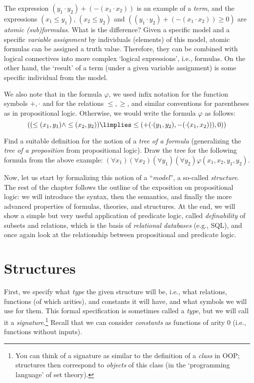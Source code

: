 The expression $(y_1 \cdot y_2)+(-(x_1\cdot x_2))$ is an example of a \emph{term}, and the expressions $(x_1\leq y_1)$, $(x_2\leq y_2)$ and $((y_1 \cdot y_2)+(-(x_1\cdot x_2))\geq 0)$ are \emph{atomic (sub)formulas}. What is the difference? Given a specific model and a specific \emph{variable assignment} by individuals (elements) of this model, atomic formulas can be assigned a truth value. Therefore, they can be combined with logical connectives into more complex `logical expressions', i.e., formulas. On the other hand, the `result' of a term (under a given variable assignment) is some specific individual from the model.

We also note that in the formula $\varphi$, we used infix notation for the function symbols $+,\cdot$ and for the relations $\leq,\geq$, and similar conventions for parentheses as in propositional logic. Otherwise, we would write the formula $\varphi$ as follows:
$$
((\leq (x_1,y_1) \land \leq(x_2,y_2))\limplies \leq(+(\cdot (y_1,y_2),-(\cdot(x_1,x_2))),0))
$$

\begin{exercise}
Find a suitable definition for the notion of a \emph{tree of a formula} (generalizing the \emph{tree of a proposition} from propositional logic). Draw the tree for the following formula from the above example: $(\forall x_1)(\forall x_2)(\forall y_1)(\forall y_2)\varphi(x_1,x_2,y_1,y_2)$.
\end{exercise}

Now, let us start by formalizing this notion of a ``\emph{model}'', a so-called \emph{structure}. The rest of the chapter follows the outline of the exposition on propositional logic: we will introduce the syntax, then the semantics, and finally the more advanced properties of formulas, theories, and structures. At the end, we will show a simple but very useful application of predicate logic, called \emph{definability} of subsets and relations, which is the basis of \emph{relational databases} (e.g., SQL), and once again look at the relationship between propositional and predicate logic.

\section{Structures}

First, we specify what \emph{type} the given structure will be, i.e., what relations, functions (of which arities), and constants it will have, and what symbols we will use for them. This formal specification is sometimes called a \emph{type}, but we will call it a \emph{signature}.\footnote{You can think of a signature  as similar to the definition of a \emph{class} in OOP; structures then correspond to \emph{objects} of this class (in the `programming language' of set theory).} Recall that we can consider \emph{constants} as functions of arity 0 (i.e., functions without inputs).

